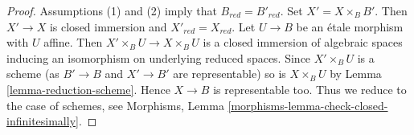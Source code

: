 \documentclass{stacks-project}
\theoremstyle{plain}
\theoremstyle{definition}
\theoremstyle{remark}
\numberwithin{equation}{subsection}
\begin{document}
\begin{proof}
Assumptions (1) and (2) imply that $B_{red} = B'_{red}$.
Set $X' = X \times_B B'$. Then $X' \to X$ is closed immersion
and $X'_{red} = X_{red}$. Let $U \to B$ be an \'etale morphism
with $U$ affine. Then $X' \times_B U \to X \times_B U$ is a
closed immersion of algebraic spaces inducing an isomorphism
on underlying reduced spaces. Since $X' \times_B U$ is a scheme
(as $B' \to B$ and $X' \to B'$ are representable) so is
$X \times_B U$ by Lemma \ref{lemma-reduction-scheme}.
Hence $X \to B$ is representable too. Thus we reduce to the
case of schemes, see
Morphisms, Lemma \ref{morphisms-lemma-check-closed-infinitesimally}.
\end{proof}
\end{document}
